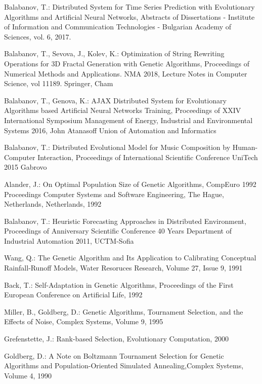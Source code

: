 \biblstarthook{}

\begin{thebibliography}{99.}

 Balabanov, T.: Distributed System for Time Series Prediction with Evolutionary Algorithms and Artificial Neural Networks, Abstracts of Dissertations - Institute of Information and Communication Technologies - Bulgarian Academy of Sciences, vol. 6, 2017.

 Balabanov, T., Sevova, J., Kolev, K.: Optimization of String Rewriting Operations for 3D Fractal Generation with Genetic Algorithms, Proceedings of Numerical Methods and Applications. NMA 2018, Lecture Notes in Computer Science, vol 11189. Springer, Cham

 Balabanov, T., Genova, K.: AJAX Distributed System for Evolutionary Algorithms based Artificial Neural Networks Training, Proceedings of XXIV International Symposium Management of Energy, Industrial and Environmental Systems 2016, John Atanasoff Union of Automation and Informatics

 Balabanov, T.: Distributed Evolutional Model for Music Composition by Human-Computer Interaction, Proceedings of International Scientific Conference UniTech 2015 Gabrovo

 Alander, J.: On Optimal Population Size of Genetic Algorithms, CompEuro 1992 Proceedings Computer Systems and Software Engineering, The Hague, Netherlands, Netherlands, 1992

 Balabanov, T.: Heuristic Forecasting Approaches in Distributed Environment, Proceedings of Anniversary Scientific Conference 40 Years Department of Industrial Automation 2011, UCTM-Sofia

 Wang, Q.: The Genetic Algorithm and Its Application to Calibrating Conceptual Rainfall‐Runoff Models, Water Resoruces Research, Volume 27, Issue 9, 1991

 Back, T.: Self-Adaptation in Genetic Algorithms, Proceedings of the First European Conference on Artificial Life, 1992

 Miller, B., Goldberg, D.: Genetic Algorithms, Tournament Selection, and the Effects of Noise, Complex Systems, Volume 9, 1995

 Grefenstette, J.: Rank-based Selection, Evolutionary Computation, 2000

 Goldberg, D.: A Note on Boltzmann Tournament Selection for Genetic Algorithms and Population-Oriented Simulated Annealing,Complex Systems, Volume 4, 1990


\end{thebibliography}

